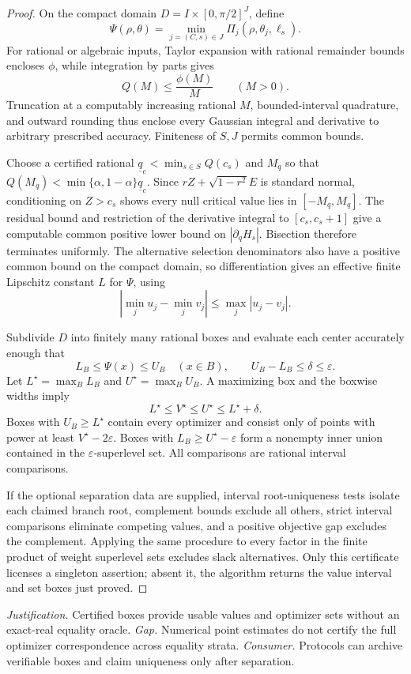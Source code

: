 \documentclass{article}
\begin{document}
\begin{proof}
On the compact domain \(D=I\times[0,\pi/2]^J\), define
\[
\Psi(\rho,\theta)=\min_{j=(C,s)\in J}\Pi_j(\rho,\theta_j,\ell_s).
\]
For rational or algebraic inputs, Taylor expansion with rational remainder bounds encloses \(\phi\), while integration by parts gives
\[
Q(M)\le\frac{\phi(M)}M\qquad(M>0).
\]
Truncation at a computably increasing rational \(M\), bounded-interval quadrature, and outward rounding thus enclose every Gaussian integral and derivative to arbitrary prescribed accuracy.  Finiteness of \(S,J\) permits common bounds.

Choose a certified rational \(\underline q_c<\min_{s\in S}Q(c_s)\) and \(M_q\) so that \(Q(M_q)<\min\{\alpha,1-\alpha\}\underline q_c\).  Since \(rZ+\sqrt{1-r^2}E\) is standard normal, conditioning on \(Z>c_s\) shows every null critical value lies in \([-M_q,M_q]\).  The residual bound and restriction of the derivative integral to \([c_s,c_s+1]\) give a computable common positive lower bound on \(|\partial_qH_s|\).  Bisection therefore terminates uniformly.  The alternative selection denominators also have a positive common bound on the compact domain, so differentiation gives an effective finite Lipschitz constant \(L\) for \(\Psi\), using
\[
|\min_j u_j-\min_j v_j|\le\max_j|u_j-v_j|.
\]

Subdivide \(D\) into finitely many rational boxes and evaluate each center accurately enough that
\[
L_B\le\Psi(x)\le U_B\quad(x\in B),
\qquad U_B-L_B\le\delta\le\varepsilon.
\]
Let \(L^\star=\max_BL_B\) and \(U^\star=\max_BU_B\).  A maximizing box and the boxwise widths imply
\[
L^\star\le V^\star\le U^\star\le L^\star+\delta.
\]
Boxes with \(U_B\ge L^\star\) contain every optimizer and consist only of points with power at least \(V^\star-2\varepsilon\).  Boxes with \(L_B\ge U^\star-\varepsilon\) form a nonempty inner union contained in the \(\varepsilon\)-superlevel set.  All comparisons are rational interval comparisons.

If the optional separation data are supplied, interval root-uniqueness tests isolate each claimed branch root, complement bounds exclude all others, strict interval comparisons eliminate competing values, and a positive objective gap excludes the complement.  Applying the same procedure to every factor in the finite product of weight superlevel sets excludes slack alternatives.  Only this certificate licenses a singleton assertion; absent it, the algorithm returns the value interval and set boxes just proved.
\end{proof}
\par\smallskip\noindent \textit{Justification.} Certified boxes provide usable values and optimizer sets without an exact-real equality oracle. \textit{Gap.} Numerical point estimates do not certify the full optimizer correspondence across equality strata. \textit{Consumer.} Protocols can archive verifiable boxes and claim uniqueness only after separation.
\end{document}
